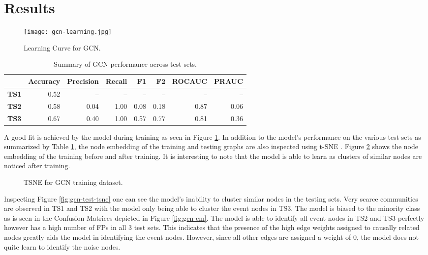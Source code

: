 \section{Results}
\label{sec:gcd-disc}

\begin{figure}[htb]
  \centering
    \texttt{[image: gcn-learning.jpg]}
    \caption{Learning Curve for GCN.}
  \label{fig:gcn-learning}
\end{figure}

\begin{table}[htb]
  \centering
  \caption{Summary of GCN performance across test sets.}
  \begin{tabular}{lrrrrrrr}
    \hline
    & Accuracy & Precision & Recall & F1 & F2 & ROCAUC & PRAUC \\
    \hline
    \textbf{TS1} & 0.52 & -- & -- & -- & -- & -- & -- \\
    \textbf{TS2} & 0.58 & 0.04 & 1.00 & 0.08 & 0.18 & 0.87 & 0.06 \\
    \textbf{TS3} & 0.67 & 0.40 & 1.00 & 0.57 & 0.77 & 0.81 & 0.36 \\
    \hline
  \end{tabular}
  \label{tab:gcn-results}
\end{table}

A good fit is achieved by the model during training as seen in Figure
\ref{fig:gcn-learning}. In addition to the model's performance on the
various test sets as summarized by Table \ref{tab:gcn-results}, the
node embedding of the training and testing graphs are also inspected
using t-SNE \cite{maaten2008visualizing}. Figure
\ref{fig:gcn-train-tsne} shows the node embedding of the training
before and after training. It is interesting to note that the model is
able to learn as clusters of similar nodes are noticed after training.

\begin{figure}[htb]
  \centering
  \caption{TSNE for GCN training dataset.}
  \label{fig:gcn-train-tsne}
\end{figure}

Inspecting Figure \ref{fig:gcn-test-tsne} one can see the model's
inability to cluster similar nodes in the testing sets. Very scarce
communities are observed in TS1 and TS2 with the model only being able
to cluster the event nodes in TS3. The model is biased to the minority
class as is seen in the Confusion Matrices depicted in Figure
\ref{fig:gcn-cm}. The model is able to identify all event nodes in TS2 and
TS3 perfectly however has a high number of FPs in all 3 test sets.
This indicates that the presence of the high edge weights assigned to
causally related nodes greatly aids the model in identifying the event
nodes. However, since all other edges are assigned a weight of 0, the
model does not quite learn to identify the noise nodes.

